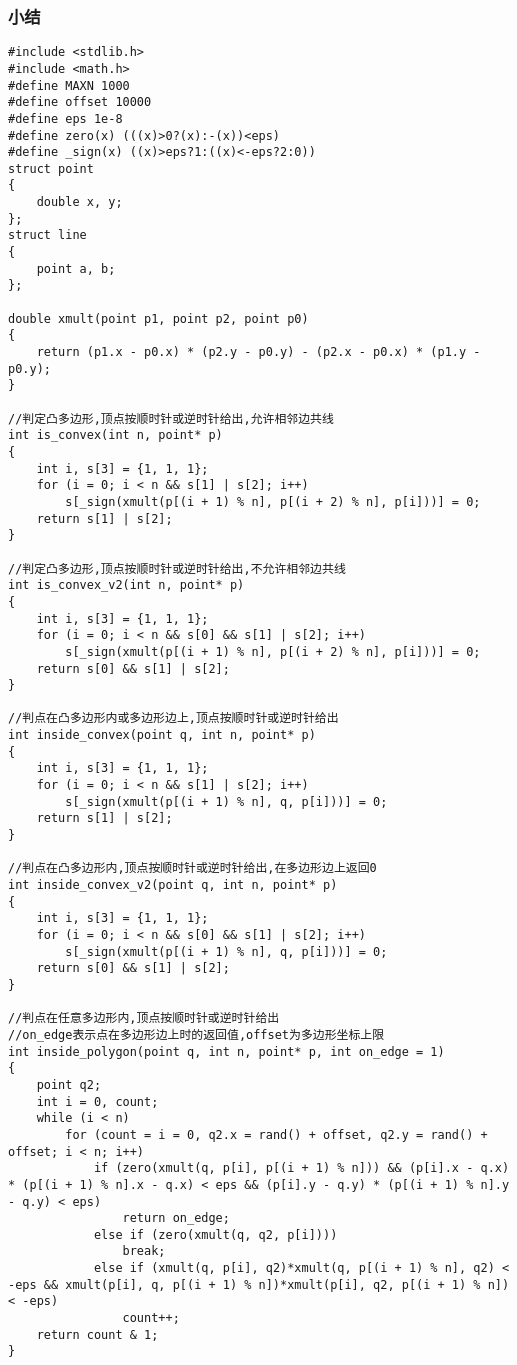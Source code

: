 \documentclass[a4]{article}
\begin{document}
\subsubsection{小结}
\begin{lstlisting}
#include <stdlib.h>
#include <math.h>
#define MAXN 1000
#define offset 10000
#define eps 1e-8
#define zero(x) (((x)>0?(x):-(x))<eps)
#define _sign(x) ((x)>eps?1:((x)<-eps?2:0))
struct point
{
    double x, y;
};
struct line
{
    point a, b;
};

double xmult(point p1, point p2, point p0)
{
    return (p1.x - p0.x) * (p2.y - p0.y) - (p2.x - p0.x) * (p1.y - p0.y);
}

//判定凸多边形,顶点按顺时针或逆时针给出,允许相邻边共线
int is_convex(int n, point* p)
{
    int i, s[3] = {1, 1, 1};
    for (i = 0; i < n && s[1] | s[2]; i++)
        s[_sign(xmult(p[(i + 1) % n], p[(i + 2) % n], p[i]))] = 0;
    return s[1] | s[2];
}

//判定凸多边形,顶点按顺时针或逆时针给出,不允许相邻边共线
int is_convex_v2(int n, point* p)
{
    int i, s[3] = {1, 1, 1};
    for (i = 0; i < n && s[0] && s[1] | s[2]; i++)
        s[_sign(xmult(p[(i + 1) % n], p[(i + 2) % n], p[i]))] = 0;
    return s[0] && s[1] | s[2];
}

//判点在凸多边形内或多边形边上,顶点按顺时针或逆时针给出
int inside_convex(point q, int n, point* p)
{
    int i, s[3] = {1, 1, 1};
    for (i = 0; i < n && s[1] | s[2]; i++)
        s[_sign(xmult(p[(i + 1) % n], q, p[i]))] = 0;
    return s[1] | s[2];
}

//判点在凸多边形内,顶点按顺时针或逆时针给出,在多边形边上返回0
int inside_convex_v2(point q, int n, point* p)
{
    int i, s[3] = {1, 1, 1};
    for (i = 0; i < n && s[0] && s[1] | s[2]; i++)
        s[_sign(xmult(p[(i + 1) % n], q, p[i]))] = 0;
    return s[0] && s[1] | s[2];
}

//判点在任意多边形内,顶点按顺时针或逆时针给出
//on_edge表示点在多边形边上时的返回值,offset为多边形坐标上限
int inside_polygon(point q, int n, point* p, int on_edge = 1)
{
    point q2;
    int i = 0, count;
    while (i < n)
        for (count = i = 0, q2.x = rand() + offset, q2.y = rand() + offset; i < n; i++)
            if (zero(xmult(q, p[i], p[(i + 1) % n])) && (p[i].x - q.x) * (p[(i + 1) % n].x - q.x) < eps && (p[i].y - q.y) * (p[(i + 1) % n].y - q.y) < eps)
                return on_edge;
            else if (zero(xmult(q, q2, p[i])))
                break;
            else if (xmult(q, p[i], q2)*xmult(q, p[(i + 1) % n], q2) < -eps && xmult(p[i], q, p[(i + 1) % n])*xmult(p[i], q2, p[(i + 1) % n]) < -eps)
                count++;
    return count & 1;
}


\end{lstlisting}
\end{document}
